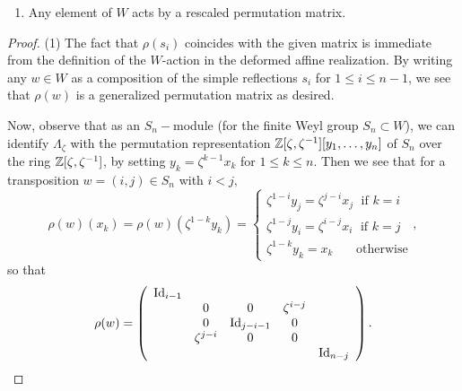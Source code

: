 \begin{lemma}
\begin{enumerate}
\[{\begin{array}{ccccccccccc}
        \zeta^{n\lambda_1} \\
            &\zeta^{n(\lambda_2-\lambda_1)}\\
            &   &\zeta^{n(\lambda_3-\lambda_2)} \\
            &   &   &\ddots \\
            &   &   &   &\zeta^{n(\lambda_{n-1}-\lambda_{n-2})}\\
            &   &   &   &   &\zeta^{-n\lambda_{n-1}}
           \end{array} }  \right).
        \]
        \item Any element of $W$ acts by a rescaled permutation matrix.
    \end{enumerate}
\end{lemma}
\begin{proof}
    (1) The fact that $\rho(s_i)$ coincides with the given matrix is immediate from the definition of the $W$-action in the deformed affine realization. 
    By writing any $w\in W$ as a composition of the simple reflections $s_i$ for $1\leq i \leq n-1$, we see that $\rho(w)$ is a generalized permutation matrix as desired. 
    
    Now, observe that as an $S_n-$module (for the finite Weyl group $S_n \subset W$), we can identify $\Lambda_{\zeta}$ with the permutation representation $\mathbb{Z}[\zeta,\zeta^{-1}][y_1, \ldots ,y_n]$ of $S_n$ over the ring $\mathbb{Z}[\zeta,\zeta^{-1}]$, by setting $y_k=\zeta^{k-1}x_k$ for $1\leq k \leq n$. 
    Then we see that for a transposition $w=(i,j) \in S_n$ with $i<j,$ 
    $$\rho(w)(x_k)=\rho(w)(\zeta^{1-k}y_k)= 
    \begin{cases}
    \zeta^{1-i}y_j=\zeta^{j-i}x_j \;\text{  if $k=i$}\\
    \zeta^{1-j}y_i=\zeta^{i-j}x_i \;\text{  if $k=j$}\\
    \zeta^{1-k}y_k=x_k \hspace{18pt}\text{  otherwise}
    \end{cases},$$
   so that
    \[\rho(w)=
        \left({\begin{array}{ccccccccccc}
        \operatorname{Id}_{i-1} &    & & &  \\
           &0  &0  & \zeta^{i-j} &\\
           &0    &\operatorname{Id}_{j-i-1} &0   &\\
           &\zeta^{j-i}   &0   &0   & \\
           &    &   &   &\operatorname{Id}_{n-j}\\
           \end{array} }  \right)
        .\]
    

\end{proof}

